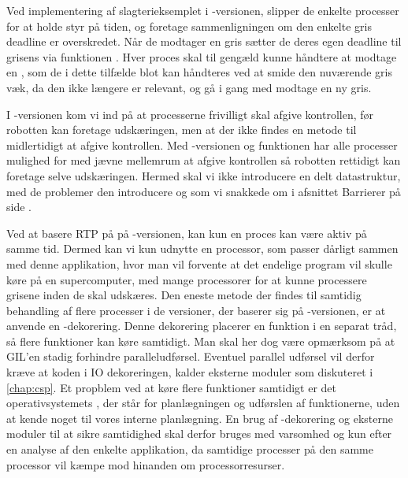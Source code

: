 Ved implementering af slagterieksemplet i -versionen, slipper de enkelte processer for at holde styr på tiden, og foretage sammenligningen om den enkelte gris deadline er overskredet. Når de modtager en gris sætter de deres egen deadline til grisens via funktionen .  Hver proces skal til gengæld kunne håndtere at modtage en , som de i dette tilfælde blot kan håndteres ved at smide den nuværende gris væk, da den ikke længere er relevant, og  gå i gang med modtage en ny gris.

I -versionen kom vi ind på at processerne frivilligt skal afgive kontrollen, før robotten kan foretage udskæringen, men at der ikke findes en metode til midlertidigt at afgive kontrollen. Med -versionen og funktionen  har alle processer mulighed for med jævne mellemrum at afgive kontrollen så robotten rettidigt kan foretage selve udskæringen. Hermed skal vi ikke introducere en delt datastruktur, med de problemer den introducere og som vi snakkede om i afsnittet Barrierer på side \pageref{sec:barrierer}.
  
Ved at basere RTP på  på -versionen, kan kun en proces  kan være aktiv på samme tid. Dermed kan vi kun udnytte en processor, som  passer dårligt sammen med denne applikation, hvor man vil forvente at det endelige program vil skulle køre på en supercomputer, med mange processorer for at kunne processere grisene inden de skal udskæres.  Den eneste metode der findes til samtidig behandling af flere processer i  de versioner, der baserer sig på -versionen, er at anvende en -dekorering. Denne dekorering placerer en funktion i en separat tråd, så flere funktioner kan køre samtidigt. Man skal her dog være opmærksom på at GIL'en stadig forhindre paralleludførsel. Eventuel parallel udførsel vil derfor kræve at koden i IO dekoreringen, kalder eksterne moduler som diskuteret i \cref{chap:csp}. Et propblem ved at køre flere funktioner samtidigt er det operativsystemets \sched, der står for planlægningen og udførslen af funktionerne, uden at kende noget til vores interne planlægning. En brug af -dekorering og eksterne moduler til at sikre samtidighed skal derfor bruges med varsomhed og kun efter en analyse af den enkelte applikation, da samtidige processer på den samme processor vil kæmpe mod hinanden om processorresurser.


 
